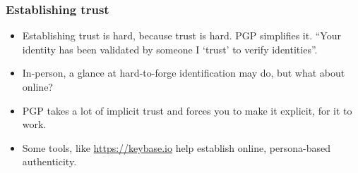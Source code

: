 \documentclass[aspectratio=1610,bigger,utf8]{beamer}
\begin{document}
\begin{frame}
	\frametitle{Establishing trust}
	\begin{itemize}
		\item Establishing trust is hard, because \alert{trust is
			hard}. PGP simplifies it. ``Your identity has been
			validated by someone I `trust' to verify identities''.
		\item In-person, a glance at hard-to-forge identification may
			do, but what about online?
		\item PGP takes a lot of implicit trust and forces you to make
			it explicit, for it to work.
		\item Some tools, like \url{https://keybase.io} help establish online,
			\alert{persona-based authenticity}.
	\end{itemize}
\end{frame}
\end{document}
